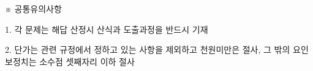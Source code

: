 \begin{framedtext}
※ 공통유의사항 \par
1. 각 문제는 해답 산정시 산식과 도출과정을 반드시 기재 \par
2. 단가는 관련 규정에서 정하고 있는 사항을 제외하고 천원미만은 절사, 그 밖의 요인 보정치는 소수점 셋째자리 이하 절사 \par
\end{framedtext}

